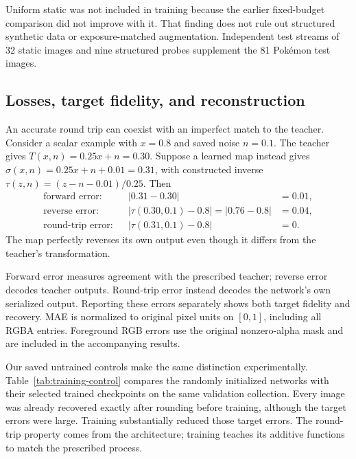 \documentclass[10pt]{article}
\begin{document}
Uniform static was not included in training because the earlier fixed-budget
comparison did not improve with it. That finding does not rule out structured
synthetic data or exposure-matched augmentation. Independent test streams of 32
static images and nine structured probes supplement the 81 Pok\'emon test images.

\subsection{Losses, target fidelity, and reconstruction}
An accurate round trip can coexist with an imperfect match to the teacher.
Consider a scalar example with $x=0.8$ and saved noise $n=0.1$. The teacher gives
$T(x,n)=0.25x+n=0.30$. Suppose a learned map instead gives
$\sigma(x,n)=0.25x+n+0.01=0.31$, with constructed inverse
$\tau(z,n)=(z-n-0.01)/0.25$. Then
\begin{equation*}
\begin{aligned}
 \text{forward error:}&& |0.31-0.30|&=0.01,\\
 \text{reverse error:}&& |\tau(0.30,0.1)-0.8|=|0.76-0.8|&=0.04,\\
 \text{round-trip error:}&& |\tau(0.31,0.1)-0.8|&=0.
\end{aligned}
\end{equation*}
The map perfectly reverses its own output even though it differs from the
teacher's transformation.

Forward error measures agreement with the prescribed teacher; reverse error
decodes teacher outputs. Round-trip error instead decodes the network's own
serialized output. Reporting these errors separately shows both target fidelity
and recovery. MAE is normalized to original pixel units
on $[0,1]$, including all RGBA entries. Foreground RGB errors use the original
nonzero-alpha mask and are included in the accompanying results.

Our saved untrained controls make the same distinction experimentally.
Table~\ref{tab:training-control} compares the randomly initialized networks
with their selected trained checkpoints on the same validation collection.
Every image was already recovered exactly after rounding before training,
although the target errors were large. Training substantially reduced those
target errors. The round-trip property comes from the architecture; training
teaches its additive functions to match the prescribed process.
\begin{table}[!htbp]
\centering\small
\caption{Before and after training on the 81 validation Pok\'emon images.
Entries are means across seeds 17, 29, and 43. ``After'' uses each seed's
validation-selected checkpoint. ``Exact RGBA images'' is the percentage of whole
images with every channel byte recovered after rounding; all three seeds attain 100\%
both before and after training.}
\label{tab:training-control}
\end{table}
\end{document}
